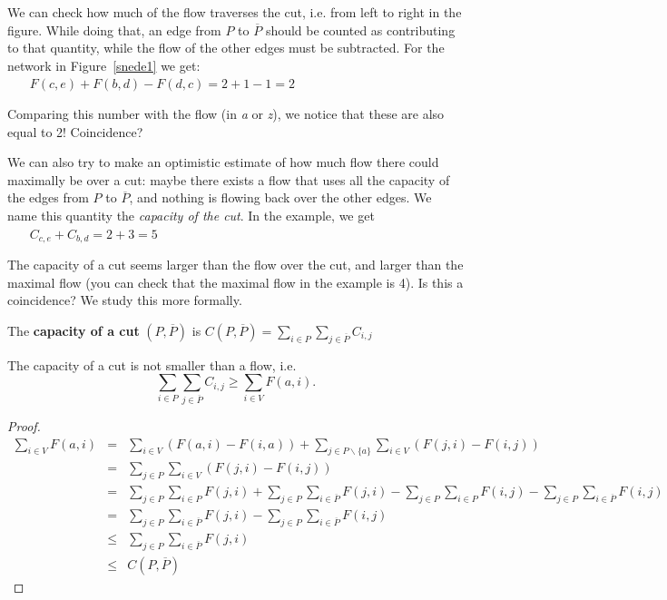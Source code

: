 We can check how much of the flow traverses the cut, i.e. from left to
right in the figure. While doing that, an edge from $P$ to
$\overline{P}$ should be counted as contributing to that quantity,
while the flow of the other edges must be subtracted. For the network
in Figure~\ref{snede1} we get: \mbox{$~~~~~~~~F(c,e) + F(b,d) -
F(d,c) = 2+1-1=2$ }

Comparing this number with the flow (in {\em a} or {\em z}), we notice
that these are also equal to 2! Coincidence?

We can also try to make an optimistic estimate of how much flow there
could maximally be over a cut: maybe there exists a flow that uses all
the capacity of the edges from $P$ to $\overline{P}$, and nothing is
flowing back over the other edges. We name this quantity the {\em
capacity of the cut}. In the example, we get \mbox{$~~~~~~~~C_{c,e} +
C_{b,d} = 2+3=5$}

The capacity of a cut seems larger than the flow over the cut, and
larger than the maximal flow (you can check that the maximal flow in
the example is 4). Is this a coincidence? We study this more formally.


 \begin{definition}
  \textup{The \textbf{capacity of a cut} $(P,\overline{P})$ is
    $C(P,\overline{P}) = \displaystyle
    \sum_{i \in P} \sum_{j \in \overline{P}} C_{i,j}$}
\end{definition}

 \begin{theorem} \label{snedeflow}
The capacity of a cut is not smaller than a flow, i.e.
\[\sum_{i \in P} \sum_{j \in \overline{P}} C_{i,j} \geq \sum_{i \in V} F(a,i).\]
\end{theorem}
\begin{proof}
\begin{eqnarray*}
\sum_{i \in V} F(a,i) & = &
                \sum_{i \in V}(F(a,i) - F(i,a)) +
                \sum_{j \in P \backslash \{a\}} \sum_{i \in V}(F(j,i) - F(i,j))\\
        & = & \sum_{j \in P} \sum_{i \in V} (F(j,i) - F(i,j)) \\
        & = & \sum_{j \in P} \sum_{i \in P} F(j,i) +
                \sum_{j \in P} \sum_{i \in \overline{P}} F(j,i) -
                \sum_{j \in P} \sum_{i \in P} F(i,j) -
                \sum_{j \in P} \sum_{i \in \overline{P}} F(i,j)\\
        & = & \sum_{j \in P} \sum_{i \in \overline{P}} F(j,i) -
                \sum_{j \in P} \sum_{i \in \overline{P}} F(i,j)\\
        & \leq & \sum_{j \in P} \sum_{i \in \overline{P}} F(j,i)\\
        & \leq & C(P,\overline{P})
\end{eqnarray*}
\end{proof}

